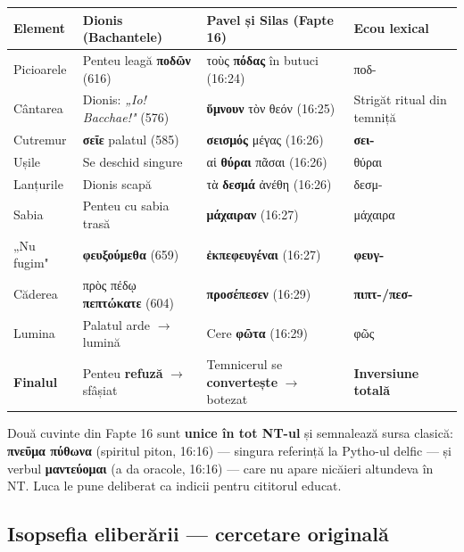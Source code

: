 \documentclass[12pt,a4paper,twoside,openany]{book}
\begin{document}
\begin{center}
\footnotesize
\begin{tabular}{L{1.8cm}L{3.5cm}L{3.5cm}L{3cm}}
\toprule
{}
\textbf{Element} & \textbf{Dionis (Bachantele)} & \textbf{Pavel și Silas (Fapte 16)} & \textbf{Ecou lexical} \\
\midrule
Picioarele & Penteu leagă \textbf{ποδῶν} (616) & τοὺς \textbf{πόδας} în butuci (16:24) & ποδ- \\
Cântarea & Dionis: \textit{„Io! Bacchae!"} (576) & \textbf{ὕμνουν} τὸν θεόν (16:25) & Strigăt ritual din temniță \\
Cutremur & \textbf{σεῖε} palatul (585) & \textbf{σεισμός} μέγας (16:26) & \textbf{σει-} \\
Ușile & Se deschid singure & αἱ \textbf{θύραι} πᾶσαι (16:26) & θύραι \\
Lanțurile & Dionis scapă & τὰ \textbf{δεσμά} ἀνέθη (16:26) & δεσμ- \\
Sabia & Penteu cu sabia trasă & \textbf{μάχαιραν} (16:27) & μάχαιρα \\
„Nu fugim" & \textbf{φευξούμεθα} (659) & \textbf{ἐκπεφευγέναι} (16:27) & \textbf{φευγ-} \\
Căderea & πρὸς πέδῳ \textbf{πεπτώκατε} (604) & \textbf{προσέπεσεν} (16:29) & \textbf{πιπτ-/πεσ-} \\
Lumina & Palatul arde $\rightarrow$ lumină & Cere \textbf{φῶτα} (16:29) & φῶς \\
\textbf{Finalul} & Penteu \textbf{refuză} $\rightarrow$ sfâșiat & Temnicerul se \textbf{convertește} $\rightarrow$ botezat & \textbf{Inversiune totală} \\
\bottomrule
\end{tabular}
\end{center}
\normalsize

Două cuvinte din Fapte 16 sunt \textbf{unice în tot NT-ul} și semnalează sursa clasică: \textbf{πνεῦμα πύθωνα} (spiritul piton, 16:16) --- singura referință la Pytho-ul delfic --- și verbul \textbf{μαντεύομαι} (a da oracole, 16:16) --- care nu apare nicăieri altundeva în NT. Luca le pune deliberat ca indicii pentru cititorul educat.

\subsection*{Isopsefia eliberării --- cercetare originală}
\end{document}
